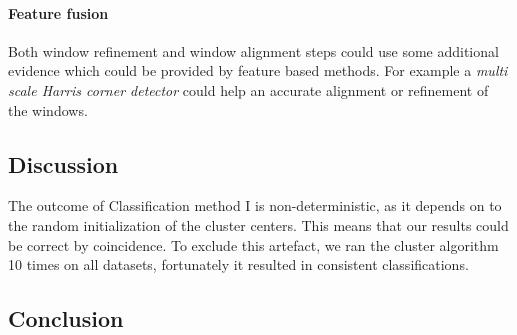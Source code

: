 \paragraph{Feature fusion}
Both window refinement and window alignment steps could use some additional
evidence which could be provided by feature based methods.  For example a
\emph{multi scale Harris corner detector} could help an accurate alignment or
refinement of the windows.






\subsection{Discussion}  %
The outcome of Classification method I is non-deterministic, as it depends on to the
random initialization of the cluster centers. This means that our results could be correct by
coincidence.  To exclude this artefact, we ran the cluster algorithm 10 times
on all datasets, fortunately it resulted in consistent classifications.






\subsection{Conclusion}



